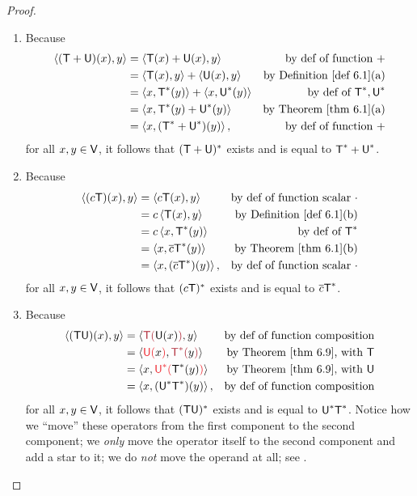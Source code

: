 \begin{proof} \ 

\begin{enumerate}
\item Because
\begin{align*}
    \LG (\T + \U)(x), y \RG
        & = \LG \T(x) + \U(x), y \RG & \text{by def of function \(+\)} \\
        & = \LG \T(x), y \RG + \LG \U(x), y \RG & \text{by \DEF{6.1}(a)} \\
        & = \LG x, \T^*(y) \RG + \LG x, \U^*(y) \RG & \text{by def of \(\T^*, \U^*\)} \\
        & = \LG x, \T^*(y) + \U^*(y) \RG & \text{by \THM{6.1}(a)} \\
        & = \LG x, (\T^* + \U^*)(y) \RG, & \text{by def of function \(+\)}
\end{align*}
for all \(x, y \in \textsf{V}\), it follows that \((\textsf{T} + \textsf{U})^*\) exists and is equal to \(\textsf{T}^* + \textsf{U}^*\).    

\item Because
\begin{align*}
    \LG (c\T)(x), y \RG
        & = \LG c\T(x), y \RG & \text{by def of function scalar \(\cdot\)} \\
        & = c\LG \T(x), y \RG & \text{by \DEF{6.1}(b)} \\
        & = c\LG x, \T^*(y) \RG & \text{by def of \(\T^*\)} \\
        & = \LG x, \conjugatet{c}\T^*(y) \RG & \text{by \THM{6.1}(b)} \\
        & = \LG x, (\conjugatet{c}\T^*)(y) \RG, & \text{by def of function scalar \(\cdot\)}
\end{align*}
for all \(x, y \in \textsf{V}\), it follows that \((c\textsf{T})^*\) exists and is equal to \(\overline{c}\textsf{T}^*\). 

\item Because
\begin{align*}
    \LG (\T\U)(x), y \RG
        & = \LG \MAROON{\T(}\U(x)\MAROON{)}, y \RG & \text{by def of function composition} \\
        & = \LG \RED{\U(}x\RED{)}, \MAROON{\T^*(}y\MAROON{)} \RG & \text{by \THM{6.9}, with \(\T\)} \\
        & = \LG x, \RED{\U^*(}\T^*(y)\RED{)} \RG & \text{by \THM{6.9}, with \(\U\)} \\
        & = \LG x, (\U^*\T^*)(y) \RG, & \text{by def of function composition}
\end{align*}
for all \(x, y \in \textsf{V}\), it follows that \((\textsf{T}\textsf{U})^*\) exists and is equal to \(\textsf{U}^*\textsf{T}^*\).
Notice how we ``move'' these operators from the first component to the second component;
we \emph{only} move the operator itself to the second component and add a star to it;
we do \emph{not} move the operand at all;
see .


\end{enumerate}
\end{proof}
